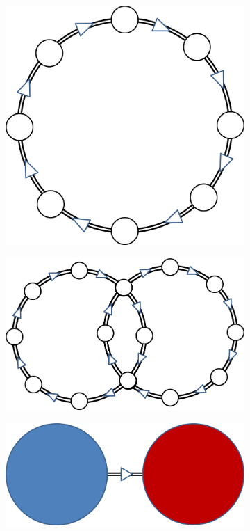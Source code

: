 \begin{figure}
\begin{center}
\begin{subfigure}[b]{0.24\linewidth}
\begin{center}
\includegraphics[width=0.7\linewidth]{../fig/expdesign2.png}\subcaption{}\label{fig:expdesign2}
\end{center}
\end{subfigure}
\begin{subfigure}[b]{0.24\linewidth}
\begin{center}
\includegraphics[width=\linewidth]{../fig/expdesign3.png}\subcaption{}\label{fig:expdesign3}
\end{center}
\end{subfigure}
\begin{subfigure}[b]{0.24\linewidth}
\begin{center}
\includegraphics[width=\linewidth]{../fig/expdesign4.png}\subcaption{}\label{fig:expdesign4}

\end{center}
\end{subfigure}
\end{center}
\end{figure}

